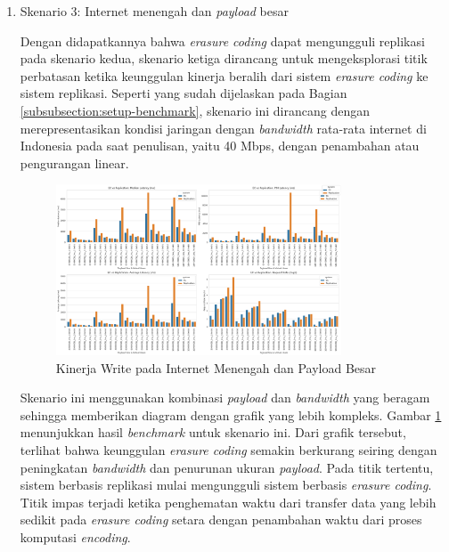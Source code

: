 \begin{enumerate}
  \item Skenario 3: Internet menengah dan \textit{payload} besar
  
  Dengan didapatkannya bahwa \textit{erasure coding} dapat mengungguli replikasi pada skenario kedua, skenario ketiga dirancang untuk mengeksplorasi titik perbatasan ketika keunggulan kinerja beralih dari sistem \textit{erasure coding} ke sistem replikasi. Seperti yang sudah dijelaskan pada Bagian \ref{subsubsection:setup-benchmark}, skenario ini dirancang dengan merepresentasikan kondisi jaringan dengan \textit{bandwidth} rata-rata internet di Indonesia pada saat penulisan, yaitu 40 Mbps, dengan penambahan atau pengurangan linear.
  
  \begin{figure}[ht]
    \centering
    \includegraphics[width=0.8\textwidth]{resources/chapter-4/write_bigload_avgnet.png}

    \caption{Kinerja Write pada Internet Menengah dan Payload Besar}
    \label{fig:write-bigload-avgnet}
  \end{figure}

  Skenario ini menggunakan kombinasi \textit{payload} dan \textit{bandwidth} yang beragam sehingga memberikan diagram dengan grafik yang lebih kompleks. Gambar \ref{fig:write-bigload-avgnet} menunjukkan hasil \textit{benchmark} untuk skenario ini. Dari grafik tersebut, terlihat bahwa keunggulan \textit{erasure coding} semakin berkurang seiring dengan peningkatan \textit{bandwidth} dan penurunan ukuran \textit{payload}. Pada titik tertentu, sistem berbasis replikasi mulai mengungguli sistem berbasis \textit{erasure coding}. Titik impas terjadi ketika penghematan waktu dari transfer data yang lebih sedikit pada \textit{erasure coding} setara dengan penambahan waktu dari proses komputasi \textit{encoding}.


\end{enumerate}
